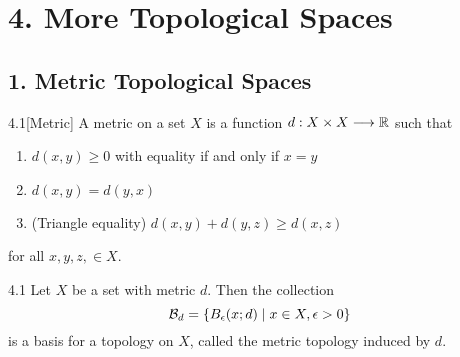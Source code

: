 \section*{4. More Topological Spaces}

\subsection*{1. Metric Topological Spaces}

\begin{customdefinition}{4.1}[Metric]
A metric on a set $X$ is a function 
$d: X \times X \longrightarrow \mathbb{R}$
such that 
\begin{enumerate}
    \item[1).] $d(x,y)\geqslant 0$ with equality if and only if $x =y$
    \item[2).] $d(x,y) = d(y,x)$
    \item[3).] (Triangle equality) $d(x,y) + d(y,z) \geqslant d(x,z)$
\end{enumerate}
for all $x, y, z, \in X$.
\end{customdefinition}

\begin{customthm}{4.1}
Let $X$ be a set with metric $d$. Then the collection
$$\mathcal{B}_d = \left\{B_{\epsilon}(x;d) \mid x\in X, \epsilon > 0\right\}$$
is a basis for a topology on $X$, called the metric topology induced by $d$.
\end{customthm}

